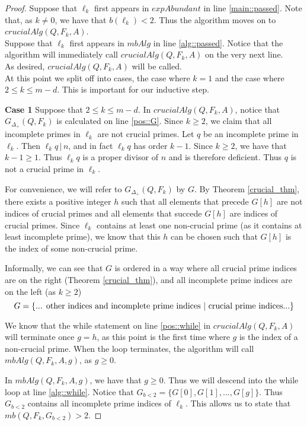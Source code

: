 \documentclass[../paper.tex]{subfiles}
\begin{document}
\begin{proof}
Suppose that $\ell_k$ first appears in $expAbundant$ in line
\ref{main::passed}. Note that, 
as $k \neq 0$, we have that $b(\ell_k) < 2$. Thus the algorithm 
moves on to $crucialAlg(Q, F_k, A)$.
\\

Suppose that $\ell_k$ first appears in $mbAlg$ in line
\ref{alg::passed}. Notice that
the algorithm will immediately call $crucialAlg(Q, F_k, A)$ on the
very next line.
\\

As desired, $crucialAlg(Q, F_k, A)$ will be called.
\\
 
At this point we split off into cases, the case
where $k = 1$ and the case where $2 \leq k \leq m - d$. This is
important for our inductive step.

\textbf{Case 1} Suppose that $2 \leq k \leq m - d$. In $crucialAlg(Q, F_k, A)$, notice 
that $G_{\Delta_+}(Q,F_k)$ is calculated on line \ref{pos::G}.
Since $k \geq 2$, we claim that
all incomplete primes in $\ell_k$ are not crucial primes.
Let $q$ be an incomplete prime in $\ell_k$. Then $\ell_k q \, |\, n$,
and in fact $\ell_k q$ has order $k - 1$. Since $k \geq 2$, we
have that $k - 1 \geq 1$. Thus $\ell_k q$ is a proper divisor of
$n$ and is therefore deficient. Thus $q$ is not a crucial prime in
$\ell_k$.

For convenience, we will refer to $G_{\Delta_+}(Q,F_k)$ by $G$. By 
Theorem {\ref{crucial_thm}}, there exists a positive integer $h$ such that
all elements that precede $G[h]$ are not indices of crucial primes
and all elements that succede $G[h]$ are indices of crucial
primes. Since $\ell_k$ contains at least one non-crucial prime (as
it contains at least incomplete prime), we know that this $h$ can
be chosen such that $G[h]$ is the index of some non-crucial prime.

Informally, we can see that $G$ is ordered in a way where all 
crucial prime indices are on the right (Theorem {\ref{crucial_thm}}), 
and all incomplete prime indices are on the left (as $k \geq 2$)
%
$$ G = \{ \text{... other indices and incomplete prime indices 
$ | $ crucial prime indices...} \} $$

We know that the while statement on line \ref{pos::while} in
$crucialAlg(Q, F_k, A)$ will terminate once $g = h$, as this point is the
first time where $g$ is the index of a non-crucial prime. When
the loop terminates, the algorithm will call $mbAlg(Q,F_k, A,
g)$, as $g \geq 0$. 

In $mbAlg(Q,F_k,A, g)$, we have that $g \geq 0$. Thus we will
descend into the while loop at line \ref{alg::while}. Notice 
that $G_{b<2} = \{G[0], G[1],
..., G[g]\}$. Thus $G_{b<2}$ contains all incomplete prime indices
of $\ell_k$. This allows us to state that $mb(Q,F_k, G_{b<2}) > 2$.


\end{proof}
\end{document}

